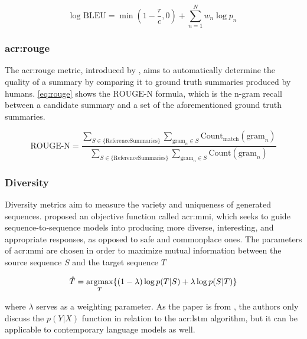 \begin{equation}
    \text{log BLEU} = \min\left(1 - \frac{r}{c}, 0\right) + \sum_{n=1}^{N} w_n \log p_n
    \label{eq:bleu}
\end{equation}

\subsubsection[Recall-Oriented Understudy (ROUGE)]{\acrfull{acr:rouge}}

The \gls{acr:rouge} metric, introduced by \cite{linROUGEPackageAutomatic2004}, aims to automatically determine the quality of a summary by comparing it to ground truth summaries produced by humans. \eqref{eq:rouge} shows the $\text{ROUGE-N}$ formula, which is the n-gram recall between a candidate summary and a set of the aforementioned ground truth summaries.

\begin{equation}
    \text{ROUGE-N} = \frac{
    \sum_{S \in \{\text{ReferenceSummaries}\}}
    \sum_{\text{gram}_n \in S}
    \text{Count}_{\text{match}}(\text{gram}_n)
    }{
    \sum_{S \in \{\text{ReferenceSummaries}\}}
    \sum_{\text{gram}_n \in S}
    \text{Count}(\text{gram}_n)
    }
    \label{eq:rouge}
\end{equation}

\subsubsection{Diversity}

Diversity metrics aim to measure the variety and uniqueness of generated sequences. \cite{liDiversityPromotingObjectiveFunction2016} proposed an objective function called \gls{acr:mmi}, which seeks to guide sequence-to-sequence models into producing more diverse, interesting, and appropriate responses, as opposed to safe and commonplace ones. The parameters of \gls{acr:mmi} are chosen in order to maximize mutual information between the source sequence $S$ and the target sequence $T$

\begin{equation}
    \hat{T} = \operatorname*{argmax}_{T} \{ (1 - \lambda) \log p(T|S) + \lambda \log p(S|T) \}
\end{equation}

\noindent where $\lambda$ serves as a weighting parameter. As the paper is from \citeyear{liDiversityPromotingObjectiveFunction2016}, the authors only discuss the $p(Y|X)$ function in relation to the \gls{acr:lstm} algorithm, but it can be applicable to contemporary language models as well.

